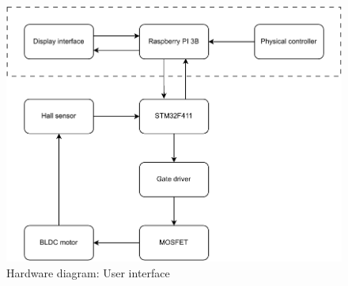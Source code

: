 \begin{figure}[H]
    \centering
    \includegraphics[width=1\textwidth]{img/DrawIO/Componentdiagram UI.pdf}
    \caption{Hardware diagram: User interface}
    \label{fig:Hardware_Diagram_UI}
\end{figure}